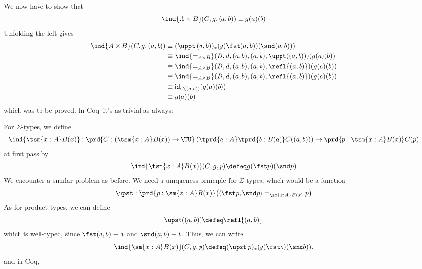 \nwenddocs{}\endmoddef
{}             
    

                      
             

\nwendcode{}We now have to show that
\[
  \ind{A \times B}(C, g, (a, b)) 
  \equiv g(a)(b)
\]
Unfolding the left gives
\begin{align*}
  \ind{A \times B}(C, g, (a, b)) 
  &\equiv
  (\uppt\, (a, b))_{*}(g(\fst (a, b))(\snd (a, b)))
  \\&\equiv
  \ind{=_{A \times B}}(D, d, (a, b), (a, b), \uppt((a, b)))(g(a)(b))
  \\&\equiv
  \ind{=_{A \times B}}(D, d, (a, b), (a, b), \refl{(a, b)})
  (g(a)(b))
  \\&\equiv
  \ind{=_{A \times B}}(D, d, (a, b), (a, b), \refl{(a, b)})
  (g(a)(b))
  \\&\equiv
  \mathsf{id}_{C((a, b))}(g(a)(b))
  \\&\equiv
  g(a)(b)
\end{align*}
which was to be proved.  In Coq, it's as trivial as always:

\nwenddocs{}\plusendmoddef
{}                

\nwendcode{}\nwdocspar
For $\Sigma$-types, we define
\[
  \ind{\tsm{x:A}B(x)} : \prd{C:(\tsm{x:A}B(x)) \to \UU}
  \left(\tprd{a:A}\tprd{b:B(a)}C((a, b))\right) \to \prd{p: \tsm{x:A}B(x)}C(p)
\]
at first pass by
\[
  \ind{\tsm{x:A}B(x)}(C, g, p)
  \defeq
  g(\fst p)(\snd p)
\]
We encounter a similar problem as before.  We need a uniqueness principle for
$\Sigma$-types, which would be a function
\[
  \upst : \prd{p : \sm{x:A}B(x)} \big(
    (\fst p, \snd p) =_{\sm{x:A}B(x)} p
  \big)
\]
As for product types, we can define
\[
  \upst((a, b)) \defeq \refl{(a, b)}
\]
which is well-typed, since $\fst(a, b) \equiv a$ and $\snd(a, b) \equiv b$.
Thus, we can write
\[
  \ind{\sm{x:A}B(x)}(C, g, p) \defeq (\upst\, p)_{*}(g(\fst p)(\snd b)).
\]
and in Coq,

